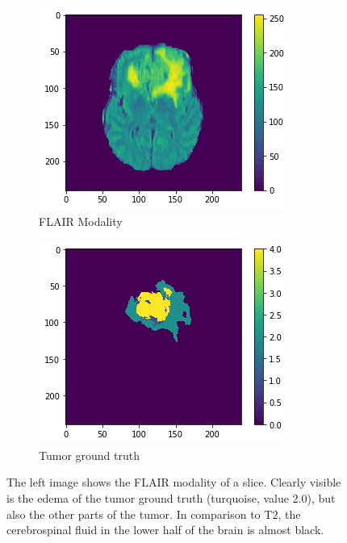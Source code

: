 \begin{figure}[H]
    \centering
    \begin{subfigure}{.5\textwidth}
        \centering
        \includegraphics[width=\linewidth]{chapters/04_segmentation/images/medical_background/flair.png}
        \caption{FLAIR Modality}
    \end{subfigure}%
    \begin{subfigure}{.5\textwidth}
        \centering
        \includegraphics[width=\linewidth]{chapters/04_segmentation/images/medical_background/tumor.png}
        \caption{Tumor ground truth}
    \end{subfigure}
    \caption{The left image shows the FLAIR modality of a slice. Clearly visible is the edema of the tumor ground truth (turquoise, value 2.0), but also the other parts of the tumor.
    In comparison to T2, the cerebrospinal fluid in the lower half of the brain is almost black.}
    \label{medical_background_flair}
\end{figure}
